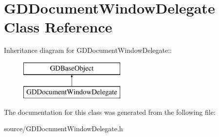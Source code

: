 \hypertarget{interface_g_d_document_window_delegate}{
\section{GDDocumentWindowDelegate Class Reference}
\label{interface_g_d_document_window_delegate}
}
Inheritance diagram for GDDocumentWindowDelegate::\begin{figure}[H]
\begin{center}
\leavevmode
\includegraphics[height=2cm]{interface_g_d_document_window_delegate}
\end{center}
\end{figure}


The documentation for this class was generated from the following file:\begin{DoxyCompactItemize}
\item 
source/GDDocumentWindowDelegate.h\end{DoxyCompactItemize}
